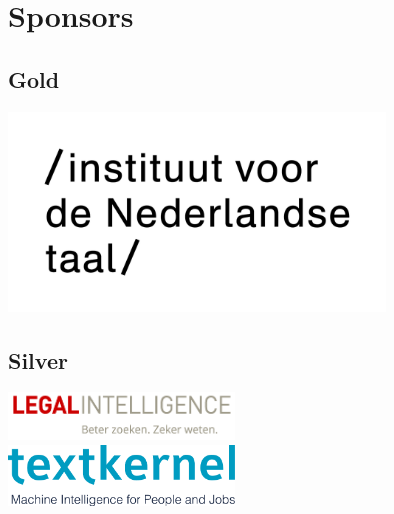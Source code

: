 \section*{Sponsors}

\subsection*{Gold}
\begin{center}
    \includegraphics[width=0.75\textwidth]{int-logo}
\end{center}

\subsection*{Silver}
\begin{center}
    \includegraphics[width=0.45\textwidth]{LI_logo_RGB_tag} \\[2cm]
    \includegraphics[width=0.45\textwidth]{textkernel-tagline}
\end{center}


